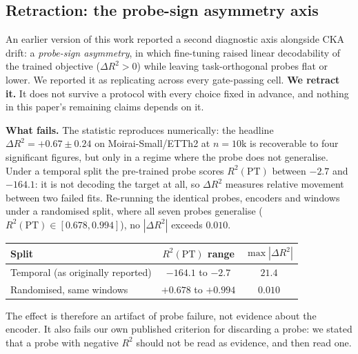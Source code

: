 \subsection{Retraction: the probe-sign asymmetry axis}
\label{sec:retraction}

An earlier version of this work reported a second diagnostic axis alongside
CKA drift: a \emph{probe-sign asymmetry}, in which fine-tuning raised linear
decodability of the trained objective ($\Delta R^2 {>} 0$) while leaving
task-orthogonal probes flat or lower. We reported it as replicating across
every gate-passing cell. \textbf{We retract it.} It does not survive a
protocol with every choice fixed in advance, and nothing in this paper's
remaining claims depends on it.

\textbf{What fails.} The statistic reproduces numerically: the headline
$\Delta R^2{=}{+}0.67{\pm}0.24$ on Moirai-Small/ETTh2 at $n{=}10$k is
recoverable to four significant figures, but only in a regime where the
probe does not generalise. Under a temporal split the pre-trained probe
scores $R^2(\text{PT})$ between $-2.7$ and $-164.1$: it is not decoding the
target at all, so $\Delta R^2$ measures relative movement between two failed
fits. Re-running the identical probes, encoders and windows under a
randomised split, where all seven probes generalise
($R^2(\text{PT}) \in [0.678, 0.994]$), no $|\Delta R^2|$ exceeds $0.010$.

\begin{center}
\small
\begin{tabular}{@{}lcc@{}}
\toprule
Split & $R^2(\text{PT})$ range & $\max |\Delta R^2|$ \\
\midrule
Temporal (as originally reported) & $-164.1$ to $-2.7$ & $21.4$ \\
Randomised, same windows          & $+0.678$ to $+0.994$ & $\mathbf{0.010}$ \\
\bottomrule
\end{tabular}
\end{center}

The effect is therefore an artifact of probe failure, not evidence about the
encoder. It also fails our own published criterion for discarding a probe: we
stated that a probe with negative $R^2$ should not be read as evidence, and
then read one.

